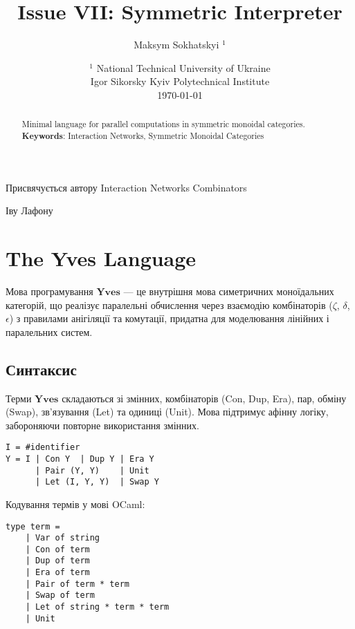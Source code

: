 \documentclass{article}
\begin{document}
\title{Issue VII: Symmetric Interpreter}
\author{Maksym Sokhatskyi $^1$}
\date{ $^1$ National Technical University of Ukraine \\
       \small Igor Sikorsky Kyiv Polytechnical Institute \\
       \today }

\maketitle

\begin{abstract}

Minimal language for parallel computations in symmetric monoidal categories. \\
{\bf Keywords}: Interaction Networks, Symmetric Monoidal Categories
\end{abstract}

\ifincludeTOC
  \tableofcontents
\fi

\newpage

\epigraph{Присвячується автору Interaction Networks Combinators}{Іву Лафону}

\section{The Yves Language}

Мова програмування $\mathbf{Yves}$ — це внутрішня мова симетричних моноїдальних категорій,
що реалізує паралельні обчислення через взаємодію комбінаторів ($\zeta$, $\delta$, $\epsilon$) з правилами
анігіляції та комутації, придатна для моделювання лінійних і паралельних систем.

\subsection{Синтаксис}

\begin{definition}
Терми $\mathbf{Yves}$ складаються зі змінних, комбінаторів (Con, Dup, Era), пар, обміну (Swap),
зв’язування (Let) та одиниці (Unit). Мова підтримує афінну логіку, забороняючи повторне використання змінних.
\begin{lstlisting}[mathescape=true]
I = #identifier
Y = I | Con Y  | Dup Y | Era Y
      | Pair (Y, Y)    | Unit
      | Let (I, Y, Y)  | Swap Y
\end{lstlisting}
\end{definition}

\begin{definition}
Кодування термів у мові OCaml:
\begin{lstlisting}[mathescape=true]
type term =
    | Var of string
    | Con of term
    | Dup of term
    | Era of term
    | Pair of term * term
    | Swap of term
    | Let of string * term * term
    | Unit
\end{lstlisting}
\end{definition}
\end{document}
